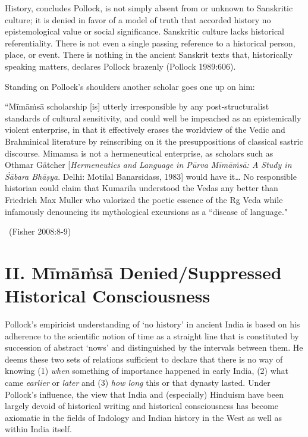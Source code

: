 History, concludes Pollock, is not simply absent from or unknown to Sanskritic culture; it is denied in favor of a model of truth that accorded history no epistemological value or social significance. Sanskritic culture lacks historical referentiality. There is not even a single passing reference to a historical person, place, or event. There is nothing in the ancient Sanskrit texts that, historically speaking matters, declares Pollock brazenly (Pollock 1989:606).

Standing on Pollock’s shoulders another scholar goes one up on him:

\begin{myquote}
“Mīmāṁsā scholarship [is] utterly irresponsible by any post-structuralist standards of cultural sensitivity, and could well be impeached as an epistemically violent enterprise, in that it effectively erases the worldview of the Vedic and Brahminical literature by reinscribing on it the presuppositions of classical sastric discourse. Mimamsa is not a hermeneutical enterprise, as scholars such as Othmar Gätcher [\textit{Hermeneutics and Language in Pūrva Mīmāṁsā: A Study in Śābara Bhāṣya}. Delhi: Motilal Banarsidass, 1983] would have it… No responsible historian could claim that Kumarila understood the Vedas any better than Friedrich Max Muller who valorized the poetic essence of the Rg Veda while infamously denouncing its mythological excursions as a “disease of language."

~\hfill (Fisher 2008:8-9)
\end{myquote}


\section*{II. Mīmāṁsā Denied/Suppressed Historical Consciousness}

Pollock’s empiricist understanding of ‘no history’ in ancient India is based on his adherence to the scientific notion of time as a straight line that is constituted by succession of abstract ‘nows’ and distinguished by the intervals between them. He deems these two sets of relations sufficient to declare that there is no way of knowing (1) \textit{when} something of importance happened in early India, (2) what came \textit{earlier }or \textit{later} and (3) \textit{how long} this or that dynasty lasted. Under Pollock’s influence, the view that India and (especially) Hinduism have been largely devoid of historical writing and historical consciousness has become axiomatic in the fields of Indology and Indian history in the West as well as within India itself.

